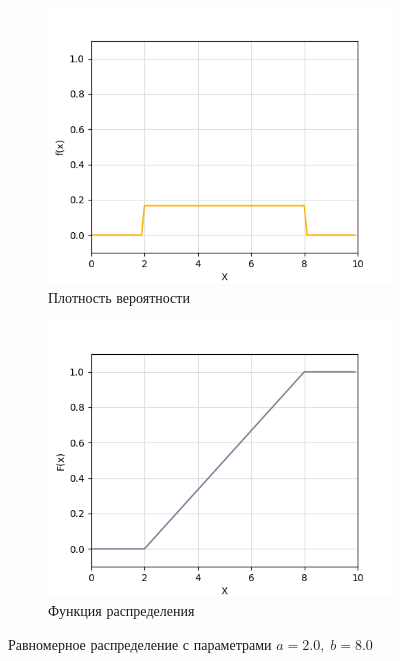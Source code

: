 \begin{figure}[H]
	\begin{subfigure}{.5\textwidth}
		\centering
		\includegraphics[width=.8\linewidth]{assets/unipdf2-8.png}
		\caption{Плотность вероятности}
		\label{fig:unipdf2-8}
	\end{subfigure}%
	\begin{subfigure}{.5\textwidth}
		\centering
		\includegraphics[width=.8\linewidth]{assets/unicdf2-8.png}
		\caption{Функция распределения}
		\label{fig:unicdf2-8}
	\end{subfigure}
	\caption{Равномерное распределение с параметрами $a = 2.0, \; b = 8.0$}
	\label{fig:uni2-8}
\end{figure}

